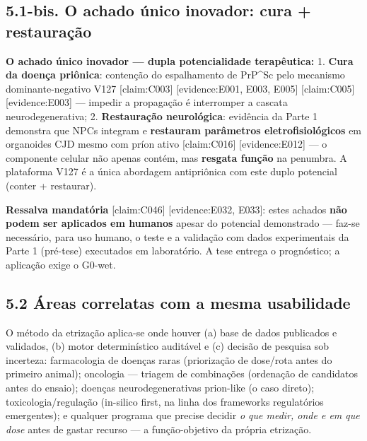 \documentclass[
  12pt,
]{report}
\begin{document}
\hypertarget{bis.-o-achado-uxfanico-inovador-cura-restaurauxe7uxe3o}{%
\subsection{5.1-bis. O achado único inovador: cura +
restauração}\label{bis.-o-achado-uxfanico-inovador-cura-restaurauxe7uxe3o}}

\textbf{O achado único inovador --- dupla potencialidade terapêutica:}
1. \textbf{Cura da doença priônica}: contenção do espalhamento de
PrP\^{}Sc pelo mecanismo dominante-negativo V127 {[}claim:C003{]}
{[}evidence:E001, E003, E005{]} {[}claim:C005{]} {[}evidence:E003{]} ---
impedir a propagação é interromper a cascata neurodegenerativa; 2.
\textbf{Restauração neurológica}: evidência da Parte 1 demonstra que
NPCs integram e \textbf{restauram parâmetros eletrofisiológicos} em
organoides CJD mesmo com príon ativo {[}claim:C016{]}
{[}evidence:E012{]} --- o componente celular não apenas contém, mas
\textbf{resgata função} na penumbra. A plataforma V127 é a única
abordagem antipriônica com este duplo potencial (conter + restaurar).

\textbf{Ressalva mandatória} {[}claim:C046{]} {[}evidence:E032, E033{]}:
estes achados \textbf{não podem ser aplicados em humanos} apesar do
potencial demonstrado --- faz-se necessário, para uso humano, o teste e
a validação com dados experimentais da Parte 1 (pré-tese) executados em
laboratório. A tese entrega o prognóstico; a aplicação exige o G0-wet.

\hypertarget{uxe1reas-correlatas-com-a-mesma-usabilidade}{%
\subsection{5.2 Áreas correlatas com a mesma
usabilidade}\label{uxe1reas-correlatas-com-a-mesma-usabilidade}}

O método da etrização aplica-se onde houver (a) base de dados publicados
e validados, (b) motor determinístico auditável e (c) decisão de
pesquisa sob incerteza: farmacologia de doenças raras (priorização de
dose/rota antes do primeiro animal); oncologia --- triagem de
combinações (ordenação de candidatos antes do ensaio); doenças
neurodegenerativas prion-like (o caso direto); toxicologia/regulação
(in-silico first, na linha dos frameworks regulatórios emergentes); e
qualquer programa que precise decidir \emph{o que medir, onde e em que
dose} antes de gastar recurso --- a função-objetivo da própria
etrização.
\end{document}
